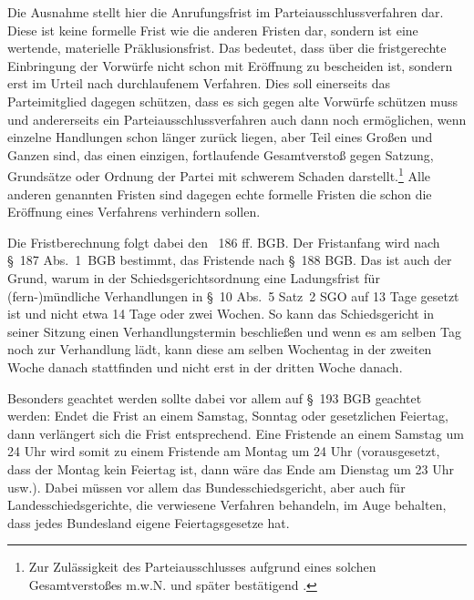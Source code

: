Die Ausnahme stellt hier die Anrufungsfrist im Parteiausschlussverfahren dar.
Diese ist keine formelle Frist wie die anderen Fristen dar, sondern ist eine wertende, materielle Präklusionsfrist.
Das bedeutet, dass über die fristgerechte Einbringung der Vorwürfe nicht schon mit Eröffnung zu bescheiden ist, sondern erst im Urteil nach durchlaufenem Verfahren.
Dies soll einerseits das Parteimitglied dagegen schützen, dass es sich gegen alte Vorwürfe schützen muss und andererseits ein Parteiausschlussverfahren auch dann noch ermöglichen, wenn einzelne Handlungen schon länger zurück liegen, aber Teil eines Großen und Ganzen sind, das einen einzigen, fortlaufende Gesamtverstoß gegen Satzung, Grundsätze oder Ordnung der Partei mit schwerem Schaden darstellt.\footnote{Zur Zulässigkeit des Parteiausschlusses aufgrund eines solchen Gesamtverstoßes \cite[S.~19]{LSGHE20130624} m.w.N. und später bestätigend \cite{BSG20131028}.}
Alle anderen genannten Fristen sind dagegen echte formelle Fristen die schon die Eröffnung eines Verfahrens verhindern sollen.

Die Fristberechnung folgt dabei den \SSS~186 ff. BGB.
Der Fristanfang wird nach \S~187 Abs.~1~BGB bestimmt, das Fristende nach \S~188 BGB.
Das ist auch der Grund, warum in der Schiedsgerichtsordnung eine Ladungsfrist für (fern-)mündliche Verhandlungen in \S~10 Abs.~5 Satz~2 SGO auf 13 Tage gesetzt ist und nicht etwa 14 Tage oder zwei Wochen.
So kann das Schiedsgericht in seiner Sitzung einen Verhandlungstermin beschließen und wenn es am selben Tag noch zur Verhandlung lädt, kann diese am selben Wochentag in der zweiten Woche danach stattfinden und nicht erst in der dritten Woche danach.

Besonders geachtet werden sollte dabei vor allem auf \S~193 BGB geachtet werden: Endet die Frist an einem Samstag, Sonntag oder gesetzlichen Feiertag, dann verlängert sich die Frist entsprechend.
Eine Fristende an einem Samstag um 24 Uhr wird somit zu einem Fristende am Montag um 24 Uhr (vorausgesetzt, dass der Montag kein Feiertag ist, dann wäre das Ende am Dienstag um 23 Uhr usw.).
Dabei müssen vor allem das Bundesschiedsgericht, aber auch für Landesschiedsgerichte, die verwiesene Verfahren behandeln, im Auge behalten, dass jedes Bundesland eigene Feiertagsgesetze hat.

